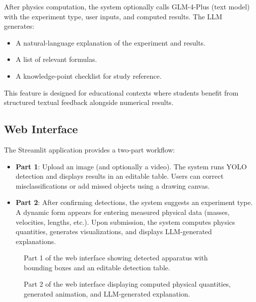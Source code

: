 \documentclass[12pt]{article}
\begin{document}
After physics computation, the system optionally calls GLM-4-Plus (text model) with the experiment type, user inputs, and computed results. The LLM generates:
\begin{itemize}[noitemsep]
  \item A natural-language explanation of the experiment and results.
  \item A list of relevant formulas.
  \item A knowledge-point checklist for study reference.
\end{itemize}

This feature is designed for educational contexts where students benefit from structured textual feedback alongside numerical results.

\subsection{Web Interface}

The Streamlit application provides a two-part workflow:

\begin{itemize}[noitemsep]
  \item \textbf{Part 1}: Upload an image (and optionally a video). The system runs YOLO detection and displays results in an editable table. Users can correct misclassifications or add missed objects using a drawing canvas.
  \item \textbf{Part 2}: After confirming detections, the system suggests an experiment type. A dynamic form appears for entering measured physical data (masses, velocities, lengths, etc.). Upon submission, the system computes physics quantities, generates visualizations, and displays LLM-generated explanations.
\end{itemize}

\begin{figure}[H]
  \centering
  \caption{Part 1 of the web interface showing detected apparatus with bounding boxes and an editable detection table.}
  \label{fig:interface_part1}
\end{figure}

\begin{figure}[H]
  \centering
  \caption{Part 2 of the web interface displaying computed physical quantities, generated animation, and LLM-generated explanation.}
  \label{fig:interface_part2}
\end{figure}
\end{document}

